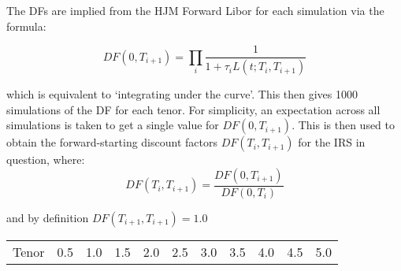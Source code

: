 \documentclass{article}
\begin{document}
The DFs are implied from the HJM Forward Libor for each simulation via
the formula:

\[
DF(0, T_{i+1}) = \prod_{i} \frac{1}{1 + \tau_i L(t; T_i, T_{i+1})} 
\]

which is equivalent to `integrating under the curve'. This then gives
1000 simulations of the DF for each tenor. For simplicity, an
expectation across all simulations is taken to get a single value for
\(DF(0, T_{i+1})\). This is then used to obtain the forward-starting
discount factors \(DF(T_i, T_{i+1})\) for the IRS in question, where: \[
DF(T_i, T_{i+1}) = \frac{DF(0, T_{i+1})}{DF(0, T_i)}
\]

and by definition \(DF(T_{i+1}, T_{i+1}) = 1.0\)

\begin{longtable}[c]{@{}cllllllllll@{}}
\toprule
\begin{minipage}[b]{0.08\columnwidth}\centering\strut
Tenor
\strut\end{minipage} &
\begin{minipage}[b]{0.15\columnwidth}\raggedright\strut
0.5
\strut\end{minipage} &
\begin{minipage}[b]{0.13\columnwidth}\raggedright\strut
1.0
\strut\end{minipage} &
\begin{minipage}[b]{0.15\columnwidth}\raggedright\strut
1.5
\strut\end{minipage} &
\begin{minipage}[b]{0.13\columnwidth}\raggedright\strut
2.0
\strut\end{minipage} &
\begin{minipage}[b]{0.15\columnwidth}\raggedright\strut
2.5
\strut\end{minipage} &
\begin{minipage}[b]{0.13\columnwidth}\raggedright\strut
3.0
\strut\end{minipage} &
\begin{minipage}[b]{0.15\columnwidth}\raggedright\strut
3.5
\strut\end{minipage} &
\begin{minipage}[b]{0.13\columnwidth}\raggedright\strut
4.0
\strut\end{minipage} &
\begin{minipage}[b]{0.15\columnwidth}\raggedright\strut
4.5
\strut\end{minipage} &
\begin{minipage}[b]{0.13\columnwidth}\raggedright\strut
5.0
\strut\end{minipage}\tabularnewline

\end{longtable}
\end{document}
